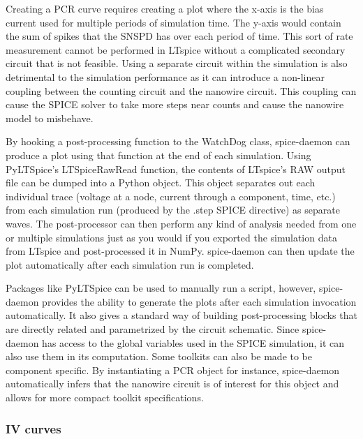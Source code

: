 \documentclass{article}
\newcommand{\cf}[1]{\textsf{#1}}
\begin{document}
Creating a PCR curve requires creating a plot where the x-axis is the bias current used for multiple
periods of simulation time. The y-axis would contain the sum of spikes that the SNSPD has over each period
of time. This sort of rate measurement cannot be performed in LTspice without a complicated secondary circuit
that is not feasible. Using a separate circuit within the simulation is also detrimental to the simulation
performance as it can introduce a non-linear coupling between the counting circuit and the nanowire circuit.
This coupling can cause the SPICE solver to take more steps near counts and cause the nanowire model to
misbehave.

By hooking a post-processing function to the \cf{WatchDog} class, spice-daemon can produce a plot
using that function at the end of each simulation. Using \cf{PyLTSpice}'s \cf{LTSpiceRawRead}
function, the contents of LTspice's RAW output file can be dumped into a Python object. This object
separates out each individual trace (voltage at a node, current through a component, time, etc.)
from each simulation run (produced by the \cf{.step} SPICE directive) as separate waves. The 
post-processor can then perform any kind of analysis needed from one or multiple simulations
just as you would if you exported the simulation data from LTspice and post-processed it in
\cf{NumPy}. spice-daemon can then update the plot automatically after each simulation run is completed.

Packages like \cf{PyLTSpice} can be used to manually 
run a script, however, spice-daemon
provides the ability to generate the plots after each simulation invocation automatically.
It also gives a standard way of building post-processing blocks that are directly related
and parametrized by the circuit schematic. Since spice-daemon has access to the global
variables used in the SPICE simulation, it can also use them in its computation.
Some toolkits can also be made to be component specific. By instantiating a PCR object
for instance, spice-daemon automatically infers that the nanowire circuit is of interest
for this object and allows for more compact toolkit specifications.

\subsubsection{IV curves}

\end{document}
